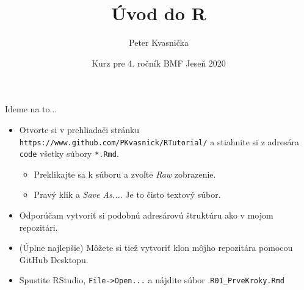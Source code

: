 \documentclass[9pt]{beamer}
\author{Peter Kvasnička}
\title{Úvod do R}
\institute{Univerzita Karlova, Praha}
\date{Kurz pre 4. ročník BMF \newline Jeseň 2020}
\begin{document}
\begin{frame}
\titlepage
\end{frame}

\clearpage  \clearpage
\clearpage  \clearpage
\clearpage  \clearpage

\begin{frame}{Ideme na to...}
	\begin{itemize}
		\item Otvorte si v prehliadači stránku \texttt{https://www.github.com/PKvasnick/RTutorial/} a stiahnite si z adresára \texttt{code} všetky súbory \texttt{*.Rmd}.
		\begin{itemize}
			\item Preklikajte sa k súboru a zvoľte \emph{Raw} zobrazenie.
			\item Pravý klik a \emph{Save As...}. Je to čisto textový súbor.
		\end{itemize}
		\item Odporúčam vytvoriť si podobnú adresárovú štruktúru ako v mojom repozitári.
		\item (Úplne najlepšie) Môžete si tiež vytvoriť klon môjho repozitára pomocou GitHub Desktopu.
		\item Spustite RStudio, \texttt{File->Open...} a nájdite súbor .\texttt{R01\_PrveKroky.Rmd}
	\end{itemize}
\end{frame}
\end{document}
